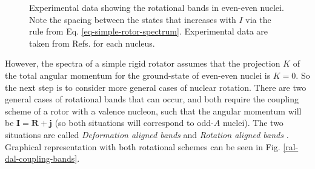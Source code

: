 \begin{figure}
    \caption{Experimental data showing the rotational bands in even-even nuclei. Note the spacing between the states that increases with $I$ via the rule from Eq. \ref{eq-simple-rotor-spectrum}. Experimental data are taken from Refs. \cite{nica2017nuclear,mccutchan2015nuclear} for each nucleus.}
    \label{rotational-bands-even-even}
\end{figure}

However, the spectra of a simple rigid rotator assumes that the projection $K$ of the total angular momentum for the ground-state of even-even nuclei is $K=0$. So the next step is to consider more general cases of nuclear rotation. There are two general cases of rotational bands that can occur, and both require the coupling scheme of a rotor with a valence nucleon, such that the angular momentum will be $\mathbf{I}=\mathbf{R}+\mathbf{j}$ (so both situations will correspond to odd-$A$ nuclei). The two situations are called \emph{Deformation aligned bands} and \emph{Rotation aligned bands} \cite{uwitonze2015assignment}. Graphical representation with both rotational schemes can be seen in Fig. \ref{ral-dal-coupling-bands}.

